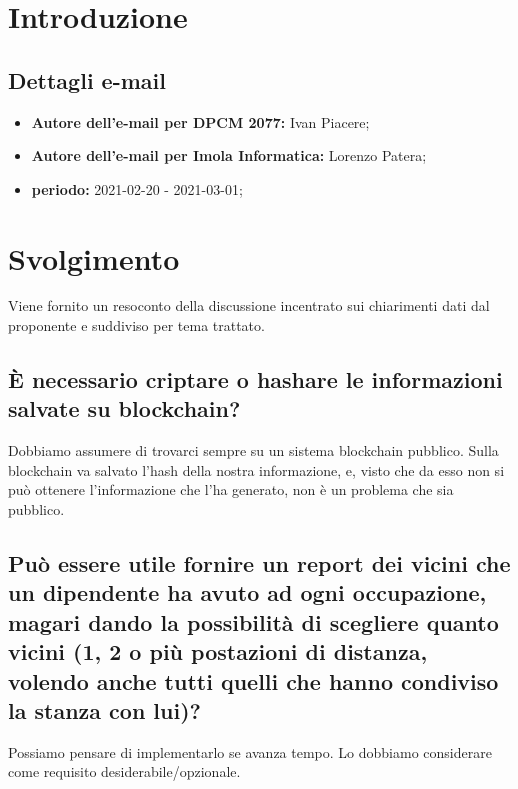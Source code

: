\section*{Introduzione}
\subsection*{Dettagli e-mail}
\begin{itemize}
	\item \textbf{Autore dell'e-mail per DPCM 2077:} Ivan Piacere;
	\item \textbf{Autore dell'e-mail per Imola Informatica:} Lorenzo Patera;
	\item \textbf{periodo:} 2021-02-20 - 2021-03-01;
\end{itemize}

\section{Svolgimento}
Viene fornito un resoconto della discussione incentrato sui chiarimenti dati dal proponente e suddiviso per tema trattato.


\subsection*{È necessario criptare o hashare le informazioni salvate su blockchain?}
Dobbiamo assumere di trovarci sempre su un sistema blockchain pubblico.
Sulla blockchain va salvato l'hash della nostra informazione, e, visto che da esso non si può ottenere l'informazione che l'ha generato, non è un problema che sia pubblico.

\subsection*{Può essere utile fornire un report dei vicini che un dipendente ha avuto ad ogni occupazione, magari dando la possibilità di scegliere quanto vicini (1, 2 o più postazioni di distanza, volendo anche tutti quelli che hanno condiviso la stanza con lui)?}
Possiamo pensare di implementarlo se avanza tempo. Lo dobbiamo considerare come requisito desiderabile/opzionale.

